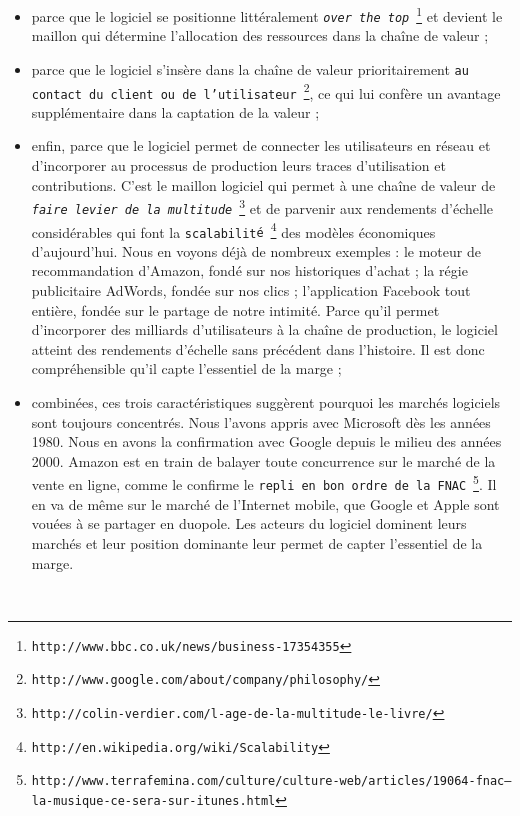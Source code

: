 \documentclass[11pt,twoside,a4paper]{article}
\begin{document}
\begin{itemize}
	\item parce que le logiciel se positionne litt{\'e}ralement \texttt{\emph{over the top}}~\footnote{\texttt{http://www.bbc.co.uk/news/business-17354355}} et devient le maillon qui d{\'e}termine l'allocation des ressources dans la cha{\^i}ne de valeur ;
	\item parce que le logiciel s'ins{\`e}re dans la cha{\^i}ne de valeur prioritairement \texttt{au contact du client ou de l'utilisateur}~\footnote{\texttt{http://www.google.com/about/company/philosophy/}}, ce qui lui conf{\`e}re un avantage suppl{\'e}mentaire dans la captation de la valeur ;
	\item enfin, parce que le logiciel permet de connecter les utilisateurs en r{\'e}seau et d'incorporer au processus de production leurs traces d'utilisation et contributions. C'est le maillon logiciel qui permet {\`a} une cha{\^i}ne de valeur de \texttt{\emph{faire levier de la multitude}}~\footnote{\texttt{http://colin-verdier.com/l-age-de-la-multitude-le-livre/}} et de parvenir aux rendements d'{\'e}chelle consid{\'e}rables qui font la \texttt{scalabilit{\'e}}~\footnote{\texttt{http://en.wikipedia.org/wiki/Scalability}} des mod{\`e}les {\'e}conomiques d'aujourd'hui. Nous en voyons d{\'e}j{\`a} de nombreux exemples : le moteur de recommandation d'Amazon, fond{\'e} sur nos historiques d'achat ; la r{\'e}gie publicitaire AdWords, fond{\'e}e sur nos clics ; l'application Facebook tout enti{\`e}re, fond{\'e}e sur le partage de notre intimit{\'e}. Parce qu'il permet d'incorporer des milliards d'utilisateurs {\`a} la cha{\^i}ne de production, le logiciel atteint des rendements d'{\'e}chelle sans pr{\'e}c{\'e}dent dans l'histoire. Il est donc compr{\'e}hensible qu'il capte l'essentiel de la marge ;
	\item combin{\'e}es, ces trois caract{\'e}ristiques sugg{\`e}rent pourquoi les march{\'e}s logiciels sont toujours concentr{\'e}s. Nous l'avons appris avec Microsoft d{\`e}s les ann{\'e}es 1980. Nous en avons la confirmation avec Google depuis le milieu des ann{\'e}es 2000. Amazon est en train de balayer toute concurrence sur le march{\'e} de la vente en ligne, comme le confirme le \texttt{repli en bon ordre de la FNAC}~\footnote{\texttt{http://www.terrafemina.com/culture/culture-web/articles/19064-fnac--la-musique-ce-sera-sur-itunes.html}}. Il en va de m{\^e}me sur le march{\'e} de l'Internet mobile, que Google et Apple sont vou{\'e}es {\`a} se partager en duopole. Les acteurs du logiciel dominent leurs march{\'e}s et leur position dominante leur permet de capter l'essentiel de la marge.
\end{itemize} ~\\
\setlength\parindent{0pt}
\end{document}
